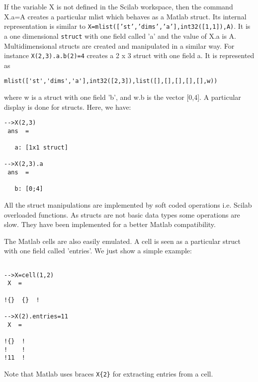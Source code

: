 If the variable X is not defined in the Scilab workspace, then
the command X.a=A creates a particular mlist which behaves as 
a Matlab struct. Its internal representation is similar to
{\tt X=mlist(['st','dims','a'],int32([1,1]),A)}.
It is a one dimensional {\tt struct} with one field called 'a' and 
the value of X.a is A.
Multidimensional structs are created and manipulated in a similar way.
For instance {\tt X(2,3).a.b(2)=4} creates a 2 x 3 struct with one field
a. It is represented as
\begin{verbatim}
mlist(['st','dims','a'],int32([2,3]),list([],[],[],[],[],w))
\end{verbatim}
where w is a struct with one field 'b', and w.b is the vector [0,4].
A particular display is done for structs. Here, we have:
\begin{verbatim}
-->X(2,3)
 ans  =
 
   a: [1x1 struct]
 
-->X(2,3).a
 ans  =
 
   b: [0;4]
\end{verbatim}

All the struct manipulations are implemented by soft coded operations
i.e. Scilab overloaded functions. As structs are not basic data types
some operations are slow. They have been implemented for a better 
Matlab compatibility.

The Matlab cells are also easily emulated. A cell is seen as a particular
struct with one field called 'entries'. We just show a simple example:

\begin{verbatim}

-->X=cell(1,2)
 X  =
 
!{}  {}  !

-->X(2).entries=11
 X  =
 
!{}  !
!    !
!11  !
\end{verbatim}

Note that Matlab uses braces \verb!X{2}! for extracting entries from
a cell. 
